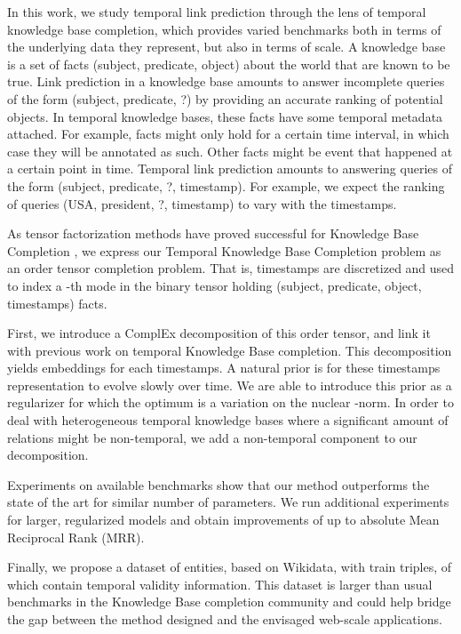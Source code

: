 \documentclass{article}
\begin{document}
In this work, we study temporal link prediction through the lens of temporal knowledge base completion, which provides varied benchmarks both in terms of the underlying data they represent, but also in terms of scale. A knowledge base is a set of facts (subject, predicate, object) about the world that are known to be true. Link prediction in a knowledge base amounts to answer incomplete queries of the form (subject, predicate, ?) by providing an accurate ranking of potential objects. In temporal knowledge bases, these facts have some temporal metadata attached. For example, facts might only hold for a certain time interval, in which case they will be annotated as such. Other facts might be event that happened at a certain point in time. Temporal link prediction amounts to answering queries of the form (subject, predicate, ?, timestamp). For example, we expect the ranking of queries (USA, president, ?, timestamp) to vary with the timestamps.





As tensor factorization methods have proved successful for Knowledge Base Completion \citep{nickel_review_2016, trouillon_complex_2016, lacroix2018canonical}, we express our Temporal Knowledge Base Completion problem as an order  tensor completion problem. That is, timestamps are discretized and used to index a -th mode in the binary tensor holding (subject, predicate, object, timestamps) facts.

First, we introduce a ComplEx \citep{trouillon_complex_2016} decomposition of this order  tensor, and link it with previous work on temporal Knowledge Base completion. This decomposition yields embeddings for each timestamps. A natural prior is for these timestamps representation to evolve slowly over time. We are able to introduce this prior as a regularizer for which the optimum is a variation on the nuclear -norm. In order to deal with heterogeneous temporal knowledge bases where a significant amount of relations might be non-temporal, we add a non-temporal component to our decomposition.

Experiments on available benchmarks show that our method outperforms the state of the art for similar number of parameters. We run additional experiments for larger, regularized models and obtain improvements of up to  absolute Mean Reciprocal Rank (MRR).  

Finally, we propose a dataset of  entities, based on Wikidata, with  train triples, of which  contain temporal validity information. This dataset is larger than usual benchmarks in the Knowledge Base completion community and could help bridge the gap between the method designed and the envisaged web-scale applications.
\end{document}

